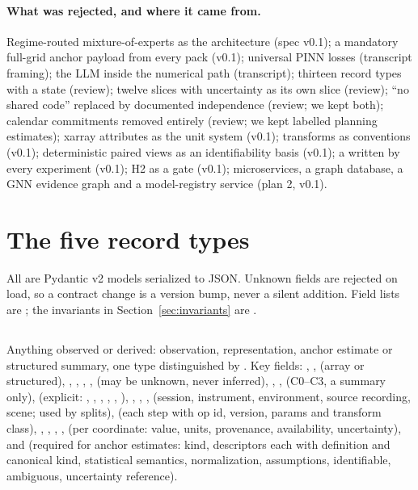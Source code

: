 \documentclass[11pt,a4paper]{article}
\begin{document}
\paragraph{What was rejected, and where it came from.} Regime-routed mixture-of-experts as the architecture (spec v0.1); a mandatory full-grid anchor payload from every pack (v0.1); universal PINN losses (transcript framing); the LLM inside the numerical path (transcript); thirteen record types with a  state (review); twelve slices with uncertainty as its own slice (review); ``no shared code'' replaced by documented independence (review; we kept both); calendar commitments removed entirely (review; we kept labelled planning estimates); xarray attributes as the unit system (v0.1); transforms as conventions (v0.1); deterministic paired views as an identifiability basis (v0.1); a  written by every experiment (v0.1); H2 as a gate (v0.1); microservices, a graph database, a GNN evidence graph and a model-registry service (plan 2, v0.1).

\section{The five record types}
\label{sec:contracts}

All are Pydantic v2 models serialized to JSON. Unknown fields are rejected on load, so a contract change is a version bump, never a silent addition. Field lists are \tagP{}; the invariants in Section~\ref{sec:invariants} are \tagG{}.

\subsection{}
\begin{sloppypar}
Anything observed or derived: observation, representation, anchor estimate or structured summary, one type distinguished by . Key fields: , ,  (array or structured), , , , ,  (may be unknown, never inferred), , ,  (C0--C3, a summary only),  (explicit: , , , , , ), , , ,  (session, instrument, environment, source recording, scene; used by splits),  (each step with op id, version, params and transform class), , , , ,  (per coordinate: value, units, provenance, availability, uncertainty), and  (required for anchor estimates: kind, descriptors each with definition and canonical kind, statistical semantics, normalization, assumptions, identifiable, ambiguous, uncertainty reference).

\end{sloppypar}
\end{document}
